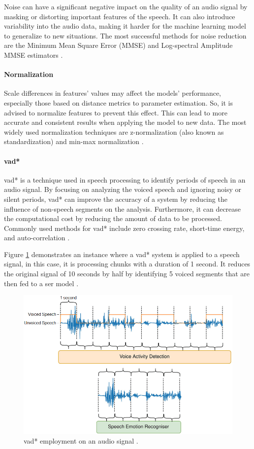 Noise can have a significant negative impact on the quality of an audio signal by masking or distorting important features of the speech. It can also introduce variability into the audio data, making it harder for the machine learning model to generalize to new situations. The most successful methods for noise reduction are the Minimum Mean Square Error (MMSE) and Log-spectral Amplitude MMSE estimators \cite{Pohjalainen2016}.

\paragraph{Normalization}

Scale differences in features' values may affect the models' performance, especially those based on distance metrics to parameter estimation. So, it is advised to normalize features to prevent this effect. This can lead to more accurate and consistent results when applying the model to new data. The most widely used normalization techniques are z-normalization (also known as standardization) and min-max normalization \cite{Akay2020}.

\paragraph{\acl{vad*}}

\ac{vad*} is a technique used in speech processing to identify periods of speech in an audio signal. By focusing on analyzing the voiced speech and ignoring noisy or silent periods, \ac{vad*} can improve the accuracy of a system by reducing the influence of non-speech segments on the analysis. Furthermore, it can decrease the computational cost by reducing the amount of data to be processed. Commonly used methods for \ac{vad*} include zero crossing rate, short-time energy, and auto-correlation \cite{Akay2020}.

Figure \ref{fig:vad} demonstrates an instance where a \ac{vad*} system is applied to a speech signal, in this case, it is processing chunks with a duration of 1 second. It reduces the original signal of 10 seconds by half by identifying 5 voiced segments that are then fed to a \ac{ser} model \cite{Milling2022}.

\begin{figure}
	\centering
	\includegraphics[width=.8\linewidth]{figs/3_methodology/speech_activity_detection.png}
	\caption{\acl{vad*} employment on an audio signal \cite{Milling2022}.}
	\label{fig:vad}
\end{figure}


